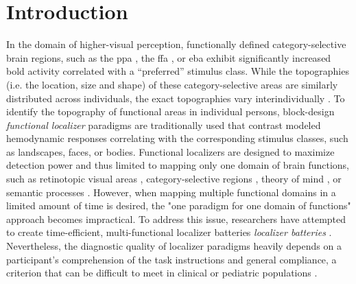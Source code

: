 
\section{Introduction}

In the domain of higher-visual perception, functionally defined
category-selective brain regions, such as the \ac{ppa} \citep{epstein1998ppa},
the \ac{ffa} \citep{kanwisher1997ffa}, or \ac{eba} \citep{downing2001bodyarea}
exhibit significantly increased \ac{bold} activity correlated with a
``preferred'' \citep{debeck2008interpreting} stimulus class.
%
While the topographies (i.e. the location, size and shape) of these
category-selective areas are similarly distributed across individuals, the exact
topographies vary interindividually \citep{rosenke2021probabilistic,
zhen2017quantifying, zhen2015quantifying, frost2012measuring}.
To identify the topography of functional areas in individual persons,
block-design \textit{functional localizer} paradigms are traditionally used that
contrast modeled hemodynamic responses correlating with the corresponding
stimulus classes, such as landscapes, faces, or bodies.
Functional localizers are designed to maximize detection power and thus limited
to mapping only one domain of brain functions, such as retinotopic visual areas
\citep{wang2015probabilistic}, category-selective regions
\citep{stigliani2015temporal}, theory of mind \citep{spunt2014validating}, or
semantic processes \citep{fedorenko2010new, fernandez2001language}.
However, when mapping multiple functional domains in a limited amount of time is
desired, the "one paradigm for one domain of functions" approach becomes
impractical.
To address this issue, researchers have attempted to create time-efficient,
multi-functional localizer batteries \textit{localizer batteries}
\citep[e.g.,][]{barch2013function, drobyshevsky2006rapid, pinel2007fast}.
Nevertheless, the diagnostic quality of localizer paradigms heavily depends on a
participant's comprehension of the task instructions and general compliance, a
criterion that can be difficult to meet in clinical or pediatric populations
\citep{eickhoff2020towards, vanderwal2019movies}.

